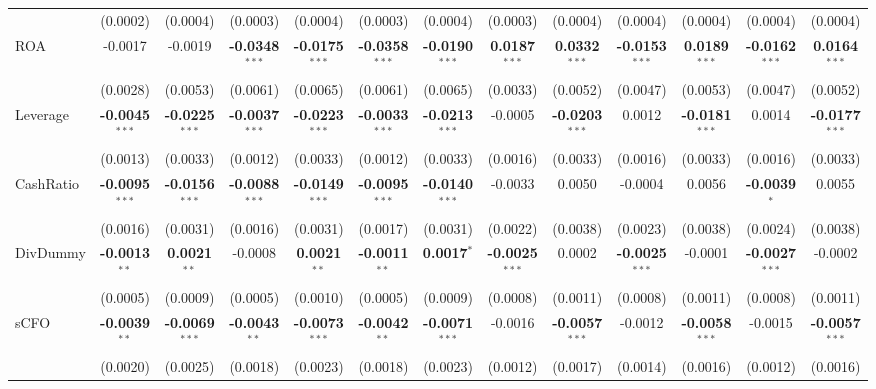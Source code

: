 \documentclass[11pt,a4paper]{article}
\begin{document}
\begin{table}[htbp]
\begin{tabular}{lcccccccccccc}
 & (0.0002) & (0.0004) & (0.0003) & (0.0004) & (0.0003) & (0.0004) & (0.0003) & (0.0004) & (0.0004) & (0.0004) & (0.0004) & (0.0004) \\
ROA & -0.0017 & -0.0019 & \textbf{-0.0348}$^{***}$ & \textbf{-0.0175}$^{***}$ & \textbf{-0.0358}$^{***}$ & \textbf{-0.0190}$^{***}$ & \textbf{0.0187}$^{***}$ & \textbf{0.0332}$^{***}$ & \textbf{-0.0153}$^{***}$ & \textbf{0.0189}$^{***}$ & \textbf{-0.0162}$^{***}$ & \textbf{0.0164}$^{***}$ \\
 & (0.0028) & (0.0053) & (0.0061) & (0.0065) & (0.0061) & (0.0065) & (0.0033) & (0.0052) & (0.0047) & (0.0053) & (0.0047) & (0.0052) \\
Leverage & \textbf{-0.0045}$^{***}$ & \textbf{-0.0225}$^{***}$ & \textbf{-0.0037}$^{***}$ & \textbf{-0.0223}$^{***}$ & \textbf{-0.0033}$^{***}$ & \textbf{-0.0213}$^{***}$ & -0.0005 & \textbf{-0.0203}$^{***}$ & 0.0012 & \textbf{-0.0181}$^{***}$ & 0.0014 & \textbf{-0.0177}$^{***}$ \\
 & (0.0013) & (0.0033) & (0.0012) & (0.0033) & (0.0012) & (0.0033) & (0.0016) & (0.0033) & (0.0016) & (0.0033) & (0.0016) & (0.0033) \\
CashRatio & \textbf{-0.0095}$^{***}$ & \textbf{-0.0156}$^{***}$ & \textbf{-0.0088}$^{***}$ & \textbf{-0.0149}$^{***}$ & \textbf{-0.0095}$^{***}$ & \textbf{-0.0140}$^{***}$ & -0.0033 & 0.0050 & -0.0004 & 0.0056 & \textbf{-0.0039}$^{*}$ & 0.0055 \\
 & (0.0016) & (0.0031) & (0.0016) & (0.0031) & (0.0017) & (0.0031) & (0.0022) & (0.0038) & (0.0023) & (0.0038) & (0.0024) & (0.0038) \\
DivDummy & \textbf{-0.0013}$^{**}$ & \textbf{0.0021}$^{**}$ & -0.0008 & \textbf{0.0021}$^{**}$ & \textbf{-0.0011}$^{**}$ & \textbf{0.0017}$^{*}$ & \textbf{-0.0025}$^{***}$ & 0.0002 & \textbf{-0.0025}$^{***}$ & -0.0001 & \textbf{-0.0027}$^{***}$ & -0.0002 \\
 & (0.0005) & (0.0009) & (0.0005) & (0.0010) & (0.0005) & (0.0009) & (0.0008) & (0.0011) & (0.0008) & (0.0011) & (0.0008) & (0.0011) \\
sCFO & \textbf{-0.0039}$^{**}$ & \textbf{-0.0069}$^{***}$ & \textbf{-0.0043}$^{**}$ & \textbf{-0.0073}$^{***}$ & \textbf{-0.0042}$^{**}$ & \textbf{-0.0071}$^{***}$ & -0.0016 & \textbf{-0.0057}$^{***}$ & -0.0012 & \textbf{-0.0058}$^{***}$ & -0.0015 & \textbf{-0.0057}$^{***}$ \\
 & (0.0020) & (0.0025) & (0.0018) & (0.0023) & (0.0018) & (0.0023) & (0.0012) & (0.0017) & (0.0014) & (0.0016) & (0.0012) & (0.0016) \\

\end{tabular}
\end{table}
\end{document}
